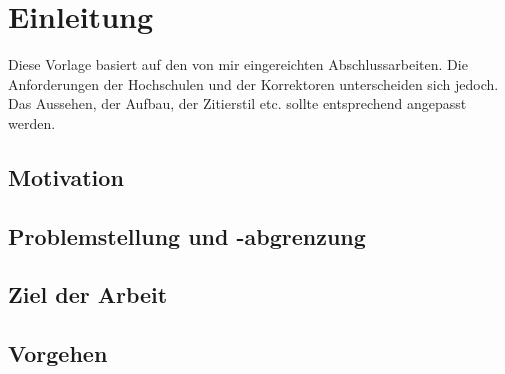 \chapter[Einleitung]{Einleitung}
\label{chap:introduction}
Diese Vorlage basiert auf den von mir eingereichten Abschlussarbeiten. Die Anforderungen der Hochschulen und der Korrektoren unterscheiden sich jedoch. Das Aussehen, der Aufbau, der Zitierstil etc. sollte entsprechend angepasst werden.

\section{Motivation}

\section{Problemstellung und -abgrenzung}

\section{Ziel der Arbeit}

\section{Vorgehen}
